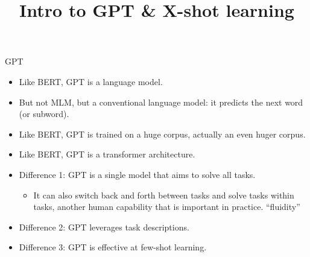 



\newcommand{\learninggoals}{
\item Recap GPT and the ideas behind standard language modelling
\item Understand the difference between fine-tuning and X-shot learning}
\def\myblue#1{\textcolor{texblue}{#1}}

\title{Intro to GPT \& X-shot learning}
\date{}




\begin{vbframe}{GPT}

\vfill

  \begin{itemize}
\item Like BERT, GPT is a language model.
\item But not MLM, but a conventional language model: it predicts
the next word (or subword).
\item Like BERT, GPT is trained on a huge corpus,
actually an even huger corpus.
\item Like BERT, GPT is a transformer architecture.
\item Difference 1: GPT is a \myblue{single model}
that aims to solve \myblue{all tasks}.  
  \begin{itemize}
    \item It can also switch back and forth between tasks and solve
    tasks within tasks, another human capability that is
    important in practice. \myblue{``fluidity''}
    \end{itemize}
\item Difference 2: GPT leverages \myblue{task descriptions}.
\item Difference 3: GPT is effective at
\myblue{few-shot learning}.
    \end{itemize}

\vfill

\end{vbframe}


